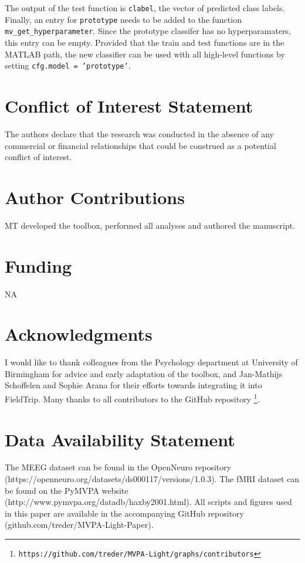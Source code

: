 \documentclass[utf8]{frontiersSCNS} %
\newcommand{\ttt}[1]{\texttt{#1}}
\begin{document}
The output of the test function is \ttt{clabel}, the vector of predicted class labels. Finally, an entry for \ttt{prototype} needs to be added to the function \ttt{mv\_get\_hyperparameter}. Since the prototype classifer has no hyperparamaters, this entry can be empty. Provided that the train and test functions are in the MATLAB path, the new classifier can be used with all high-level functions by setting \ttt{cfg.model = 'prototype'}.


\section*{Conflict of Interest Statement}

The authors declare that the research was conducted in the absence of any commercial or financial relationships that could be construed as a potential conflict of interest.

\section*{Author Contributions}

MT developed the toolbox, performed all analyses and authored the manuscript.

\section*{Funding}
NA

\section*{Acknowledgments}
I would like to thank colleagues from the Psychology department at University of Birmingham for advice and early adaptation of the toolbox, and Jan-Mathijs Schoffelen and Sophie Arana for their efforts towards integrating it into FieldTrip. Many thanks to all contributors to the GitHub repository
\footnote{\ttt{https://github.com/treder/MVPA-Light/graphs/contributors}}.


\section*{Data Availability Statement}
The MEEG dataset can be found in the OpenNeuro repository (https://openneuro.org/datasets/ds000117/versions/1.0.3). The fMRI dataset can be found on the PyMVPA website (http://www.pymvpa.org/datadb/haxby2001.html). All scripts and figures used in this paper are available in the accompanying GitHub repository (github.com/treder/MVPA-Light-Paper).
\end{document}

